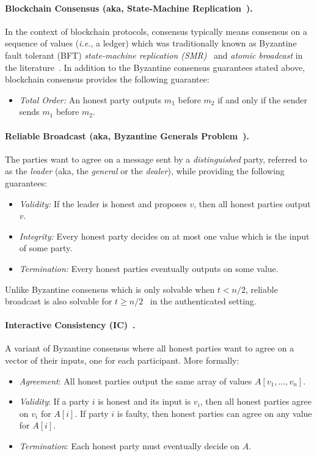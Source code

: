 \documentclass[11pt]{article}
\newcommand{\ie}{\textit{i.e.}}
\theoremstyle{mytheoremstyle}
\begin{document}
\paragraph{Blockchain Consensus (aka, State-Machine Replication~\cite{schneider:1990}).} In the context of blockchain protocols, consensus typically means consensus on a sequence of values (\ie, a ledger) which was traditionally known as Byzantine fault tolerant (BFT) \emph{state-machine replication (SMR)}~\cite{schneider:1990,pbft:99} and \emph{atomic broadcast} in the literature~\cite{AtomicBroadcast:1993,DBLP:journals/corr/CachinV17}. In addition to the Byzantine consensus guarantees stated above, blockchain consensus provides the following guarantee:

\begin{itemize}	
	\item \textit{Total Order:} An honest party outputs $m_1$ before $m_2$ if and only if the sender sends $m_1$ before $m_2$.
\end{itemize}

\paragraph{Reliable Broadcast (aka, Byzantine Generals Problem~\cite{lsp82}).}
The parties want to agree on a message sent by a \emph{distinguished} party, referred to as the \emph{leader} (aka, the \emph{general} or the \emph{dealer}), while providing the following guarantees:
\begin{itemize}
	\item \textit{Validity:} If the leader is honest and proposes $v$, then all honest parties output $v$.
	\item \textit{Integrity:} Every honest party decides on at most one value which is the input of some party.
	\item \textit{Termination:} Every honest parties eventually outputs on some value.
\end{itemize}
Unlike Byzantine consensus which is only solvable when ${t<n/2}$, reliable broadcast is also solvable for ${t \geq n/2}$~\cite{lsp82} in the authenticated setting.

\paragraph{Interactive Consistency (IC)~\cite{pease1980reaching}.} A variant of Byzantine consensus where all honest parties want to agree on a vector of their inputs, one for each participant. More formally:
\begin{itemize}
	\item \emph{Agreement}: All honest parties output the same array of values $A[v_1,...,v_n]$. 
	\item \emph{Validity}: If a party $i$ is honest and its input is $v_i$, then all honest parties agree on $v_i$ for $A[i]$. If party $i$ is faulty, then honest parties can agree on any value for $A[i]$.
	\item \emph{Termination}: Each honest party must eventually decide on $A$.
\end{itemize}
\end{document}
